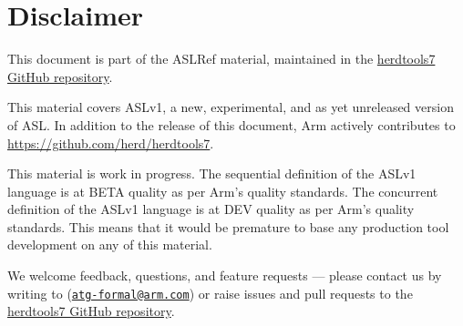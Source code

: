 \chapter{Disclaimer}

This document is part of the ASLRef material, maintained in the
\href{https://github.com/herd/herdtools7}{herdtools7 GitHub repository}.

This material covers ASLv1, a new, experimental, and as yet unreleased version of ASL.
In addition to the release of this document, Arm actively contributes to
\url{https://github.com/herd/herdtools7}.

This material is work in progress.
The sequential definition of the ASLv1 language is at BETA quality as per Arm’s quality standards.
The concurrent definition of the ASLv1 language is at DEV quality as per Arm's quality standards.
This means that it would be premature to base any production tool development on any of this material.

We welcome feedback, questions, and feature requests — please contact us by writing
to (\href{mailto:atg-formal@arm.com}{\tt atg-formal@arm.com}) or raise issues and
pull requests to the \href{https://github.com/herd/herdtools7}{herdtools7 GitHub repository}.
